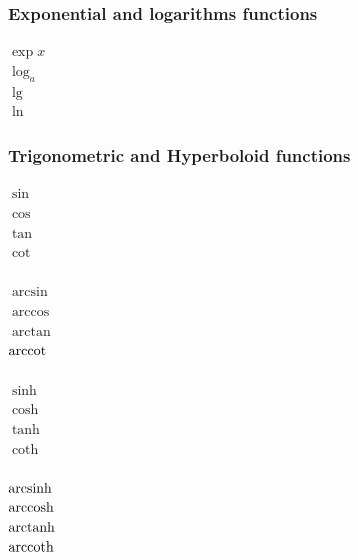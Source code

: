 \subsubsection{Exponential and logarithms functions}
\begin{tabbing}
\mySymbols
 $\exp x $             \>                     \> \verb`   `  \\
 $\log_a $             \>                     \> \verb`   `  \\
 $\lg $                \>                     \> \verb`   `  \\
 $\ln $                \>                     \> \verb`   `  \\
\end{tabbing}

\subsubsection{Trigonometric and Hyperboloid functions}
\begin{tabbing}
\mySymbols
 $\sin$                \>                     \> \verb`   `  \\
 $\cos $               \>                     \> \verb`   `  \\
 $\tan $               \>                     \> \verb`   `  \\
 $\cot $               \>                     \> \verb`   `  \\
\\
 $\arcsin $            \>                     \> \verb`   `  \\
 $\arccos $            \>                     \> \verb`   `  \\
 $\arctan $            \>                     \> \verb`   `  \\
 $\mathrm{arccot} $            \>                     \> \verb`   `  \\
\\ 
 $\sinh $              \>                     \> \verb`   `  \\
 $\cosh $              \>                     \> \verb`   `  \\
 $\tanh $              \>                     \> \verb`   `  \\
 $\coth $              \>                     \> \verb`   `  \\
\\
 $\mathrm{arcsinh} $           \>                     \> \verb`   `  \\
 $\mathrm{arccosh} $           \>                     \> \verb`   `  \\
 $\mathrm{arctanh} $           \>                     \> \verb`   `  \\
 $\mathrm{arccoth} $           \>                     \> \verb`   `  \\
\end{tabbing}

